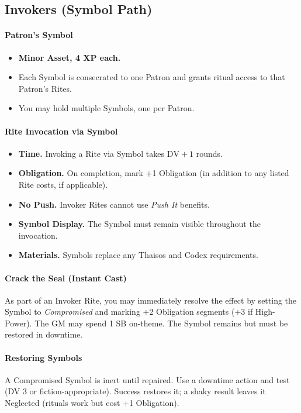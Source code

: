 \subsection{Invokers (Symbol Path)}
\paragraph{Patron’s Symbol}
\begin{itemize}
  \item \textbf{Minor Asset, 4 XP each.}
  \item Each Symbol is consecrated to one Patron and grants ritual access to that Patron’s Rites. 
  \item You may hold multiple Symbols, one per Patron.
\end{itemize}

\paragraph{Rite Invocation via Symbol}
\begin{itemize}
  \item \textbf{Time.} Invoking a Rite via Symbol takes \(\text{DV} + 1\) rounds.
  \item \textbf{Obligation.} On completion, mark +1 Obligation (in addition to any listed Rite costs, if applicable).
  \item \textbf{No Push.} Invoker Rites cannot use \emph{Push It} benefits.
  \item \textbf{Symbol Display.} The Symbol must remain visible throughout the invocation.
  \item \textbf{Materials.} Symbols replace any Thaisos and Codex requirements.
\end{itemize}

\paragraph{Crack the Seal (Instant Cast)}
As part of an Invoker Rite, you may immediately resolve the effect by setting the Symbol to \emph{Compromised} and marking +2 Obligation segments (+3 if High-Power). The GM may spend 1 SB on-theme. The Symbol remains but must be restored in downtime.

\paragraph{Restoring Symbols}
A Compromised Symbol is inert until repaired. Use a downtime action and test (DV 3 or fiction-appropriate). Success restores it; a shaky result leaves it Neglected (rituals work but cost +1 Obligation).


